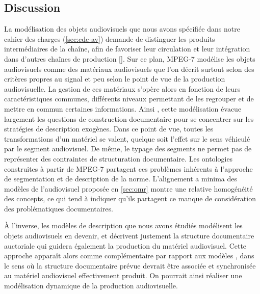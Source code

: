 \subsection*{Discussion}
La modélisation des objets audiovisuels que nous avons spécifiée dans notre cahier des charges (\ref{sec:cdc-av}) demande de distinguer les produits intermédiaires de la chaîne, afin de favoriser leur circulation et leur intégration dans d'autres chaînes de production [].
Sur ce plan, MPEG-7 modélise les objets audiovisuels comme des matériaux audiovisuels que l'on décrit surtout selon des critères propres au signal et peu selon le point de vue de la production audiovisuelle.
La gestion de ces matériaux s'opère alors en fonction de leurs caractéristiques communes, différents niveaux permettant de les regrouper et de mettre en commun certaines informations. 
Ainsi , cette modélisation évacue largement les questions de construction documentaire pour se concentrer sur les stratégies de description exogènes.
Dans ce point de vue, toutes les transformations d'un matériel se valent, quelque soit l'effet sur le sens véhiculé par le segment audiovisuel. 
De même, le typage des segments ne permet pas de représenter des contraintes de structuration documentaire.
Les ontologies construites à partir de MPEG-7 partagent ces problèmes inhérents à l'approche de segmentation et de description de la norme.
L'alignement a minima des modèles de l'audiovisuel proposée en \ref{sec:omr} montre une relative homogénéité des concepts, ce qui tend à indiquer qu'ils partagent  ce manque de considération des problématiques documentaires. 

À l'inverse, les modèles de description  que nous avons étudiés modélisent les objets audiovisuels en devenir, et décrivent justement la structure documentaire auctoriale qui guidera également la production du matériel audiovisuel.
Cette approche apparaît alors comme complémentaire par rapport aux modèles , dans le sens où la structure documentaire prévue devrait être associée et synchronisée au matériel audiovisuel effectivement produit.
On pourrait ainsi réaliser une modélisation dynamique de la production audiovisuelle.\\


